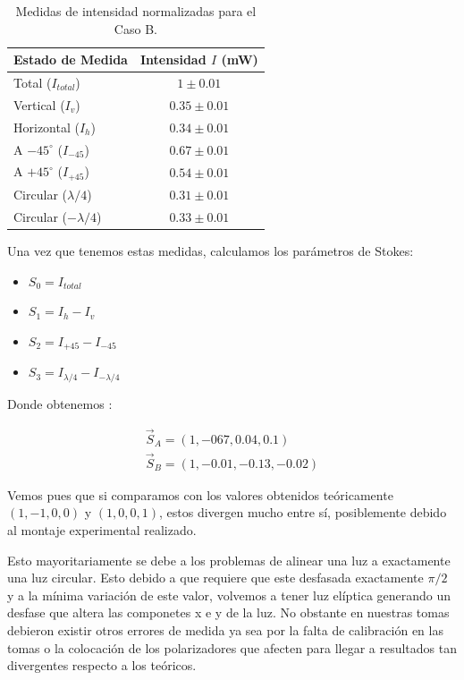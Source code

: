 \documentclass[11pt, a4paper, twocolumn]{article}
\begin{document}
\begin{table}[h!]
\centering
\caption{Medidas de intensidad normalizadas para el Caso B.}
\begin{tabular}{|l|c|}
\hline
\textbf{Estado de Medida} & \textbf{Intensidad $I$ (mW)} \\ \hline
Total ($I_{total}$) & $1 \pm 0.01$ \\ \hline
Vertical ($I_v$) & $0.35 \pm 0.01$ \\ \hline
Horizontal ($I_h$) & $0.34 \pm 0.01$ \\ \hline
A $-45^\circ$ ($I_{-45}$) & $0.67 \pm 0.01$ \\ \hline
A $+45^\circ$ ($I_{+45}$) & $0.54 \pm 0.01$ \\ \hline
Circular ($\lambda/4$) & $0.31 \pm 0.01$ \\ \hline
Circular ($-\lambda/4$) & $0.33 \pm 0.01$ \\ \hline
\end{tabular}
\end{table}

\vspace{0.5cm}

Una vez que tenemos estas medidas, calculamos los parámetros de Stokes:
\begin{itemize}
    \item $S_{0} = I_{total}$
    \item $S_{1} = I_{h} - I_{v}$
    \item $S_{2} = I_{+45} - I_{-45}$
    \item $S_{3} = I_{\lambda/4} - I_{-\lambda/4}$ 
\end{itemize}

Donde obtenemos :

\begin{align}
    \vec{S}_{A} = (1, -067, 0.04, 0.1) \\
    \vec{S}_{B} = (1, -0.01, -0.13, -0.02)    
\end{align}

Vemos pues que si comparamos con los valores obtenidos teóricamente $(1, -1, 0, 0)$ y $(1, 0, 0, 1)$, estos divergen mucho entre sí,
posiblemente debido al montaje experimental realizado. 

Esto mayoritariamente se debe a los problemas de alinear una luz a exactamente una luz circular. Esto debido a que requiere que este desfasada
exactamente $\pi /2$ y a la mínima variación de este valor, volvemos a tener luz elíptica generando un desfase que altera las componetes x e y 
de la luz. No obstante en nuestras tomas debieron existir otros errores de medida ya sea por la falta de calibración en las tomas o la colocación de
los polarizadores que afecten para llegar a resultados tan divergentes respecto a los teóricos. 
\end{document}
